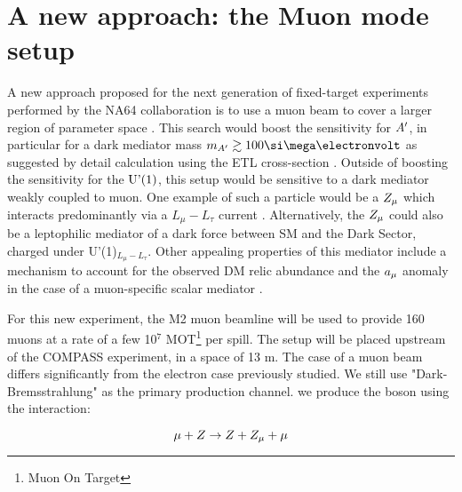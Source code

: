 \section{A new approach: the Muon mode setup}
\label{ch5:sec:muon-mode-setup}

A new approach proposed for the next generation of fixed-target experiments performed by the NA64 collaboration is to use a muon beam to cover a larger region of parameter space \cite{Gninenko:2019qiv}. This search would boost the sensitivity for $A'$, in particular for a dark mediator mass $m_{\DM} \gtrsim 100 \mev$ as suggested by detail calculation using the ETL cross-section \cite{Gninenko:2019qiv}. Outside of boosting the sensitivity for the $\textrm{U'(1)}$, this setup would be sensitive to a dark mediator weakly coupled to muon. One example of such a particle would be a $Z_{\mu}$ which interacts predominantly via a $L_{\mu} - L_{\tau}$ current \cite{krasnikov2017muon,GNINENKO2001119}. Alternatively, the $Z_{\mu}$ could also be a leptophilic mediator of a dark force between SM and the Dark Sector, charged under U'(1)$_{L_{\mu} - L_{\tau}}$. Other appealing properties of this mediator include a mechanism to account for the observed DM relic abundance \cite{GNINENKO2001119,Kirpichnikov:2020tcf,PhysRevLett.121.011102} and the $a_{\mu}$ anomaly in the case of a muon-specific scalar mediator \cite{krasnikov2017light,PhysRevD.95.115005}.

For this new experiment, the M2 muon beamline will be used to provide 160 \gev muons at a rate of a few 10$^7$ MOT\footnote{Muon On Target} per spill. The setup will be placed upstream of the COMPASS experiment, in a space of 13 \si{\meter}. The case of a muon beam differs significantly from the electron case previously studied. We still use "Dark-Bremsstrahlung" as the primary production channel. we produce the boson using the interaction:

\begin{equation}
  \label{eq:dm-muon-int}
  \mu + Z \to Z + Z_{\mu} + \mu
\end{equation}

